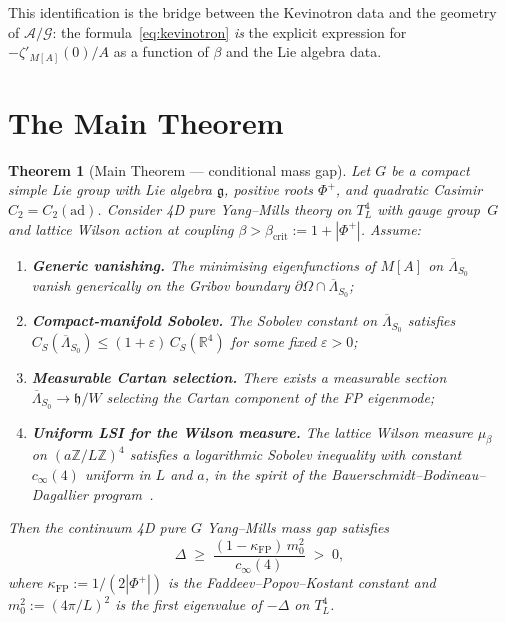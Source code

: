 \documentclass[11pt,a4paper]{amsart}
\newtheorem{theorem}{Theorem}[section]
\theoremstyle{definition}
\theoremstyle{remark}
\newcommand{\R}{\mathbb{R}}
\newcommand{\Z}{\mathbb{Z}}
\newcommand{\calA}{\mathcal{A}}
\newcommand{\calG}{\mathcal{G}}
\newcommand{\gfrak}{\mathfrak{g}}
\newcommand{\hfrak}{\mathfrak{h}}
\newcommand{\ad}{\mathrm{ad}}
\newcommand{\kFP}{\kappa_{\mathrm{FP}}}
\newcommand{\PhiPlus}{\Phi^+}
\newcommand{\cinf}{c_{\infty}}
\newcommand{\betacrit}{\beta_{\mathrm{crit}}}
\begin{document}
This identification is the bridge between the Kevinotron data and the
geometry of $\calA/\calG$: the formula~\eqref{eq:kevinotron} \emph{is}
the explicit expression for $-\zeta'_{M[A]}(0)/A$ as a function of $\beta$
and the Lie algebra data.

\section{The Main Theorem}\label{sec:main}

\begin{theorem}[Main Theorem --- conditional mass gap]\label{thm:main}
Let $G$ be a compact simple Lie group with Lie algebra $\gfrak$, positive
roots $\PhiPlus$, and quadratic Casimir $C_2 = C_2(\ad)$.
Consider 4D pure Yang--Mills theory on $T^4_L$ with gauge group~$G$ and
lattice Wilson action at coupling $\beta > \betacrit := 1 + |\PhiPlus|$.
Assume:
\begin{enumerate}[label=\textnormal{(H\arabic*)}, leftmargin=3em]
\item \textbf{Generic vanishing.} The minimising eigenfunctions of $M[A]$
      on $\overline{\Lambda}_{S_0}$ vanish generically on the Gribov
      boundary $\partial\Omega \cap \overline{\Lambda}_{S_0}$;
\item \textbf{Compact-manifold Sobolev.}
      The Sobolev constant on $\overline{\Lambda}_{S_0}$ satisfies
      $C_S(\overline{\Lambda}_{S_0}) \leq (1+\varepsilon)\,C_S(\R^4)$
      for some fixed $\varepsilon > 0$;
\item \textbf{Measurable Cartan selection.}
      There exists a measurable section
      $\overline{\Lambda}_{S_0} \to \hfrak/W$
      selecting the Cartan component of the FP eigenmode;
\item \textbf{Uniform LSI for the Wilson measure.}
      The lattice Wilson measure $\mu_\beta$ on $(a\Z/L\Z)^4$ satisfies
      a logarithmic Sobolev inequality with constant $\cinf(4)$ uniform
      in $L$ and $a$, in the spirit of the Bauerschmidt--Bodineau--Dagallier
      program~\cite{BBD2024, BD2024}.
\end{enumerate}
Then the continuum 4D pure $G$ Yang--Mills mass gap satisfies
\begin{equation}\label{eq:main}
\boxed{\quad
\Delta \;\geq\; \frac{(1 - \kFP)\,m_0^2}{\cinf(4)} \;>\; 0,
\quad}
\end{equation}
where $\kFP := 1/(2|\PhiPlus|)$ is the Faddeev--Popov--Kostant constant
and $m_0^2 := (4\pi/L)^2$ is the first eigenvalue of $-\Delta$ on $T^4_L$.
\end{theorem}
\end{document}
